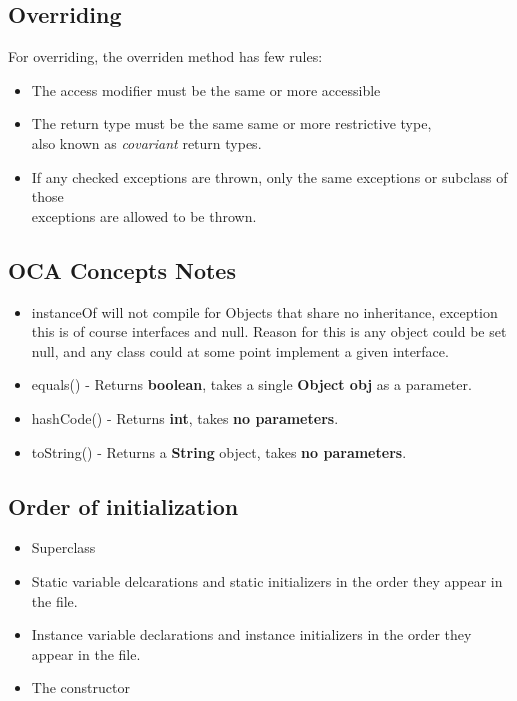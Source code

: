 \documentclass[12pt]{article}
\begin{document}
\subsection{Overriding}
For overriding, the overriden method has few rules:

\begin{itemize}
  \item The access modifier must be the same or more accessible
  \item The return type must be the same same or more restrictive type, \\
   also known as \textit{covariant} return types.
  \item If any checked exceptions are thrown, only the same exceptions or subclass of those \\
   exceptions are allowed to be thrown.
 \end{itemize}


\subsection{OCA Concepts Notes} 
\begin{itemize}
  \item instanceOf will not compile for Objects that share no inheritance, exception this is of course interfaces and null.
    \subitem Reason for this is any object could be set null, and any class could at some point implement a given interface.
  \item equals() - Returns \textbf{boolean}, takes a single \textbf{Object obj} as a parameter.
  \item hashCode() - Returns \textbf{int}, takes \textbf{no parameters}.
  \item toString() - Returns a \textbf{String} object, takes \textbf{no parameters}.
\end{itemize}

\subsection* {Order of initialization} 
\begin{itemize}
  \item Superclass
  \item Static variable delcarations and static initializers in the order they appear in the file.
  \item Instance variable declarations and instance initializers in the order they appear in the file.
  \item The constructor
\end{itemize}
\end{document}
